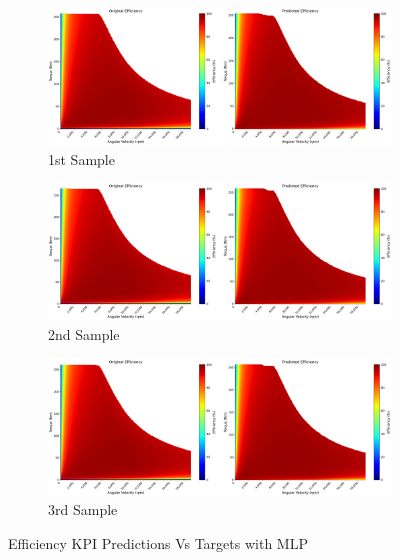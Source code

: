 \documentclass{report} %
\begin{document}
\begin{figure}[H]
    \centering
    \begin{subfigure}{1\textwidth}
        \centering
        \includegraphics[width=1\textwidth]{./ReportImages/KPI3Dprediction1.png} 
        \caption{1st Sample} 
        \label{fig:1st Sample}
    \end{subfigure}\hfill
    \begin{subfigure}{1\textwidth}
        \centering
        \includegraphics[width=1\textwidth]{./ReportImages/KPI3Dprediction2.png} 
        \caption{2nd Sample} 
        \label{fig:2nd Sample}
    \end{subfigure}\hfill
    \begin{subfigure}{1\textwidth}
        \centering
        \includegraphics[width=1\textwidth]{./ReportImages/KPI3Dprediction3.png} 
        \caption{3rd Sample} 
        \label{fig:3rd Sample}
    \end{subfigure}
    \caption{Efficiency \ac{KPI} Predictions Vs Targets with \ac{MLP}}
    \label{fig:Efficiency KPI Predictions Vs Targets with MLP}
\end{figure} 
\end{document}
